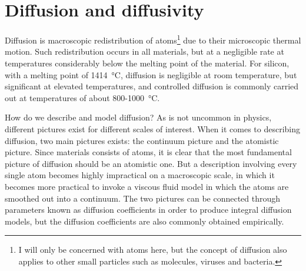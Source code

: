 \documentclass[11pt,bibliography=totoc,index=totoc]{scrbook}   %
\newcommand{\comment}[1]{\hl{#1}}
\begin{document}




%
\section{Diffusion and diffusivity}\label{sec:Diffusion}
%

Diffusion is macroscopic redistribution of atoms\footnote{I will only be concerned with atoms here, but the concept of diffusion also applies to other small particles such as molecules, viruses and bacteria.} due to their microscopic thermal motion. 
Such redistribution occurs in all materials, but at a negligible rate at temperatures considerably below the melting point of the material.
For silicon, with a melting point of \SI{1414}{\celsius}, diffusion is negligible at room temperature, 
but significant at elevated temperatures, and controlled diffusion is commonly carried out at temperatures 
of about 800-\SI{1000}{\celsius}. 

How do we describe and model diffusion?
As is not uncommon in physics, different pictures exist for different scales of interest. 
When it comes to describing diffusion, two main pictures exists: the continuum picture and the atomistic picture. 
Since materials consists of atoms, it is clear that the most fundamental picture of diffusion should be an atomistic one.
But a description involving every single atom becomes highly impractical on a macroscopic scale,
in which it becomes more practical to invoke a viscous fluid model in which the atoms are smoothed out into a continuum.
The two pictures can be connected through parameters known as diffusion coefficients in order to produce integral diffusion models,
but the diffusion coefficients are also commonly obtained empirically.
\end{document}
